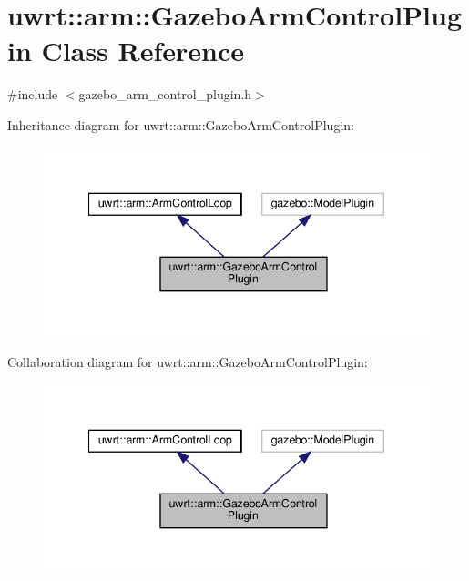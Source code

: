 \hypertarget{classuwrt_1_1arm_1_1_gazebo_arm_control_plugin}{}\section{uwrt\+:\+:arm\+:\+:Gazebo\+Arm\+Control\+Plugin Class Reference}
\label{classuwrt_1_1arm_1_1_gazebo_arm_control_plugin}


{\ttfamily \#include $<$gazebo\+\_\+arm\+\_\+control\+\_\+plugin.\+h$>$}



Inheritance diagram for uwrt\+:\+:arm\+:\+:Gazebo\+Arm\+Control\+Plugin\+:
\nopagebreak
\begin{figure}[H]
\begin{center}
\leavevmode
\includegraphics[width=340pt]{classuwrt_1_1arm_1_1_gazebo_arm_control_plugin__inherit__graph}
\end{center}
\end{figure}


Collaboration diagram for uwrt\+:\+:arm\+:\+:Gazebo\+Arm\+Control\+Plugin\+:
\nopagebreak
\begin{figure}[H]
\begin{center}
\leavevmode
\includegraphics[width=340pt]{classuwrt_1_1arm_1_1_gazebo_arm_control_plugin__coll__graph}
\end{center}
\end{figure}
